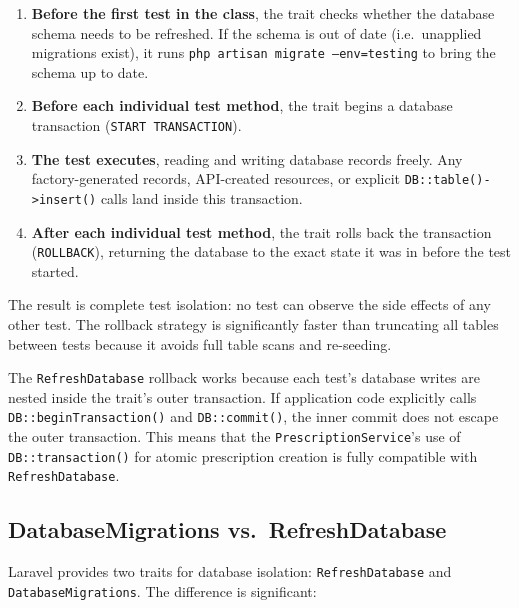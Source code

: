 \begin{enumerate}
  \item \textbf{Before the first test in the class}, the trait checks
    whether the database schema needs to be refreshed. If the schema
    is out of date (i.e.\ unapplied migrations exist), it runs
    \texttt{php artisan migrate --env=testing} to bring the schema
    up to date.

  \item \textbf{Before each individual test method}, the trait begins
    a database transaction (\texttt{START TRANSACTION}).

  \item \textbf{The test executes}, reading and writing database records
    freely. Any factory-generated records, API-created resources, or
    explicit \texttt{DB::table()->insert()} calls land inside this
    transaction.

  \item \textbf{After each individual test method}, the trait rolls back
    the transaction (\texttt{ROLLBACK}), returning the database to the
    exact state it was in before the test started.
\end{enumerate}

The result is complete test isolation: no test can observe the side
effects of any other test. The rollback strategy is significantly faster
than truncating all tables between tests because it avoids full table
scans and re-seeding.

\begin{notebox}
  The \texttt{RefreshDatabase} rollback works because each test's
  database writes are nested inside the trait's outer transaction. If
  application code explicitly calls \texttt{DB::beginTransaction()} and
  \texttt{DB::commit()}, the inner commit does not escape the outer
  transaction. This means that the \texttt{PrescriptionService}'s use
  of \texttt{DB::transaction()} for atomic prescription creation is
  fully compatible with \texttt{RefreshDatabase}.
\end{notebox}

\subsection{DatabaseMigrations vs.\ RefreshDatabase}

Laravel provides two traits for database isolation:
\texttt{RefreshDatabase} and \texttt{DatabaseMigrations}. The
difference is significant:

